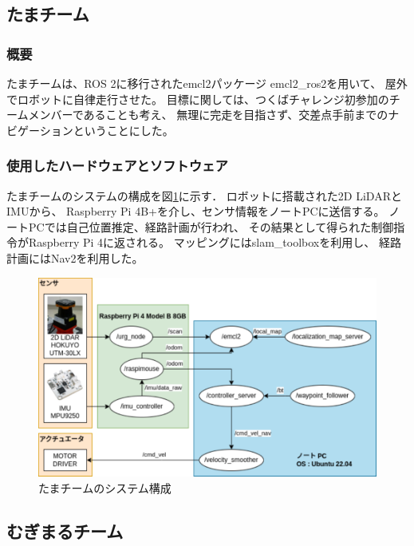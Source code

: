 \documentclass[twocolumn,9pt]{jsproceedings}
\begin{document}
\subsection{たまチーム}\label{sub:localization}
\subsubsection{概要}
たまチームは、ROS 2に移行されたemcl2パッケージ
emcl2\_ros2を用いて、
屋外でロボットに自律走行させた。
目標に関しては、つくばチャレンジ初参加のチームメンバーであることも考え、
無理に完走を目指さず、交差点手前までのナビゲーションということにした。

\subsubsection{使用したハードウェアとソフトウェア}

たまチームのシステムの構成を図\ref{fig:tama_system_diagram}に示す．
ロボットに搭載された2D LiDARとIMUから、
Raspberry Pi 4B+を介し、センサ情報をノートPCに送信する。
ノートPCでは自己位置推定、経路計画が行われ、
その結果として得られた制御指令がRaspberry Pi 4に返される。
マッピングにはslam\_toolboxを利用し、
経路計画にはNav2を利用した。

\begin{figure}[h]
  \begin{center}
    \includegraphics[width=1.0\linewidth]{figs/tama_system_diagram.pdf}
    \caption{たまチームのシステム構成}
    \label{fig:tama_system_diagram}
  \end{center}
\end{figure}

\subsection{むぎまるチーム}
\end{document}
